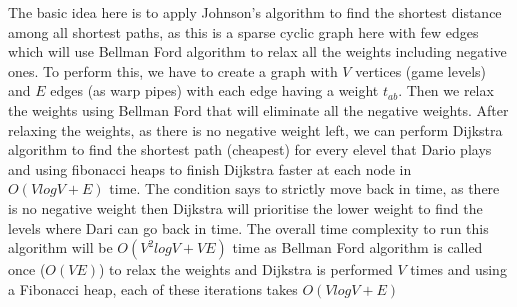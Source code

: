 \documentclass[12pt,twoside]{article}
\begin{document}
\begin{problems}
\begin{problemparts}
\problempart %
The basic idea here is to apply Johnson's algorithm to find the shortest distance among all shortest paths, as this is a sparse cyclic graph here with few edges which will use Bellman Ford algorithm to relax all the weights including negative ones. To perform this, we have to create a graph with $V$ vertices (game levels) and $E$ edges (as warp pipes) with each edge having a weight $t_{ab}$. Then we relax the weights using Bellman Ford that will eliminate all the negative weights. After relaxing the weights, as there is no negative weight left, we can perform Dijkstra algorithm to find the shortest path (cheapest) for every elevel that Dario plays and using fibonacci heaps to finish Dijkstra faster at each node in $O(VlogV + E)$ time. The condition says to strictly move back in time, as there is no negative weight then Dijkstra will prioritise the lower weight to find the levels where Dari can go back in time. The overall time complexity to run this algorithm will be $O(V^{2}logV + VE)$ time as Bellman Ford algorithm is called once ($O(VE)$) to relax the weights and Dijkstra is performed $V$ times and using a Fibonacci heap, each of these iterations takes $O(VlogV + E)$

\end{problemparts}

\newpage
\problem  %


\end{problems}
\end{document}
